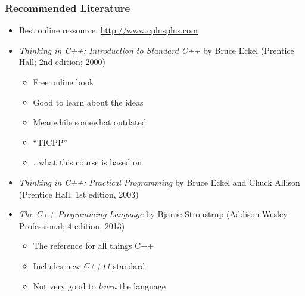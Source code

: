 \documentclass{slides}
\begin{document}
\begin{frame}
  \frametitle{Recommended Literature}
  \begin{itemize}
  \item Best online ressource: \url{http://www.cplusplus.com}
  \item \textit{Thinking in C++: Introduction to Standard C++} by
    Bruce Eckel (Prentice Hall; 2nd edition; 2000)
    \begin{itemize}
    \item Free online book
    \item Good to learn about the ideas
    \item Meanwhile somewhat outdated
    \item ``TICPP''
    \item \dots what this course is based on
    \end{itemize}
  \item \textit{Thinking in C++: Practical Programming} by Bruce Eckel
    and Chuck Allison (Prentice Hall; 1st edition, 2003)
  \item \textit{The C++ Programming Language} by Bjarne Stroustrup
    (Addison-Wesley Professional; 4 edition, 2013)
    \begin{itemize}
    \item The reference for all things C++
    \item Includes new \textit{C++11} standard
    \item Not very good to \emph{learn} the language
    \end{itemize}
  \end{itemize}
\end{frame}
\end{document}

